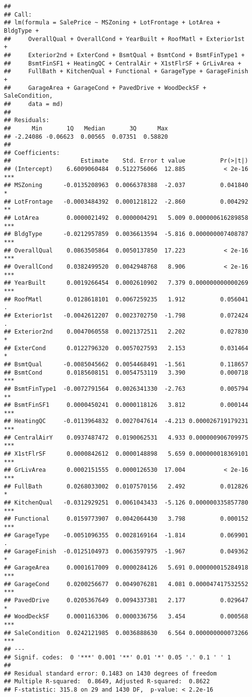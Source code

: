 \documentclass[]{article}
\begin{document}
\begin{verbatim}
## 
## Call:
## lm(formula = SalePrice ~ MSZoning + LotFrontage + LotArea + BldgType + 
##     OverallQual + OverallCond + YearBuilt + RoofMatl + Exterior1st + 
##     Exterior2nd + ExterCond + BsmtQual + BsmtCond + BsmtFinType1 + 
##     BsmtFinSF1 + HeatingQC + CentralAir + X1stFlrSF + GrLivArea + 
##     FullBath + KitchenQual + Functional + GarageType + GarageFinish + 
##     GarageArea + GarageCond + PavedDrive + WoodDeckSF + SaleCondition, 
##     data = md)
## 
## Residuals:
##      Min       1Q   Median       3Q      Max 
## -2.24086 -0.06623  0.00565  0.07351  0.58820 
## 
## Coefficients:
##                    Estimate    Std. Error t value          Pr(>|t|)    
## (Intercept)    6.6009060484  0.5122756066  12.885           < 2e-16 ***
## MSZoning      -0.0135208963  0.0066378388  -2.037          0.041840 *  
## LotFrontage   -0.0003484392  0.0001218122  -2.860          0.004292 ** 
## LotArea        0.0000021492  0.0000004291   5.009 0.000000616289858 ***
## BldgType      -0.0212957859  0.0036613594  -5.816 0.000000007408787 ***
## OverallQual    0.0863505864  0.0050137850  17.223           < 2e-16 ***
## OverallCond    0.0382499520  0.0042948768   8.906           < 2e-16 ***
## YearBuilt      0.0019266454  0.0002610902   7.379 0.000000000000269 ***
## RoofMatl       0.0128618101  0.0067259235   1.912          0.056041 .  
## Exterior1st   -0.0042612207  0.0023702750  -1.798          0.072424 .  
## Exterior2nd    0.0047060558  0.0021372511   2.202          0.027830 *  
## ExterCond      0.0122796320  0.0057027593   2.153          0.031464 *  
## BsmtQual      -0.0085045662  0.0054468491  -1.561          0.118657    
## BsmtCond       0.0185608151  0.0054753119   3.390          0.000718 ***
## BsmtFinType1  -0.0072791564  0.0026341330  -2.763          0.005794 ** 
## BsmtFinSF1     0.0000450241  0.0000118126   3.812          0.000144 ***
## HeatingQC     -0.0113964832  0.0027047614  -4.213 0.000026719179231 ***
## CentralAirY    0.0937487472  0.0190062531   4.933 0.000000906709975 ***
## X1stFlrSF      0.0000842612  0.0000148898   5.659 0.000000018369101 ***
## GrLivArea      0.0002151555  0.0000126530  17.004           < 2e-16 ***
## FullBath       0.0268033002  0.0107570156   2.492          0.012826 *  
## KitchenQual   -0.0312929251  0.0061043433  -5.126 0.000000335857780 ***
## Functional     0.0159773907  0.0042064430   3.798          0.000152 ***
## GarageType    -0.0051096355  0.0028169164  -1.814          0.069901 .  
## GarageFinish  -0.0125104973  0.0063597975  -1.967          0.049362 *  
## GarageArea     0.0001617009  0.0000284126   5.691 0.000000015284918 ***
## GarageCond     0.0200256677  0.0049076281   4.081 0.000047417532552 ***
## PavedDrive     0.0205367649  0.0094337381   2.177          0.029647 *  
## WoodDeckSF     0.0001163306  0.0000336756   3.454          0.000568 ***
## SaleCondition  0.0242121985  0.0036888630   6.564 0.000000000073266 ***
## ---
## Signif. codes:  0 '***' 0.001 '**' 0.01 '*' 0.05 '.' 0.1 ' ' 1
## 
## Residual standard error: 0.1483 on 1430 degrees of freedom
## Multiple R-squared:  0.8649, Adjusted R-squared:  0.8622 
## F-statistic: 315.8 on 29 and 1430 DF,  p-value: < 2.2e-16
\end{verbatim}
\end{document}

